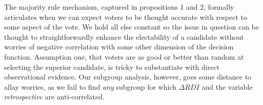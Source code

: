 \documentclass[11pt]{article}
\begin{document}
The majority rule mechanism, captured in propositions 1 and 2, formally articulates when we can expect voters to be thought accurate with respect to some aspect of the vote. We hold all else constant so the issue in question can be thought to straightforwardly enhance the electability of a candidate without worries of negative correlation with some other dimension of the decision function. Assumption one, that voters are as good or better than random at selecting the superior candidate, is tricky to substantiate with direct observational evidence. Our subgroup analysis, however, goes some distance to allay worries, as we fail to find \emph{any} subgroup for which $\Delta RDI$  and the variable \emph{retrospective} are anti-correlated. %


\end{document}
